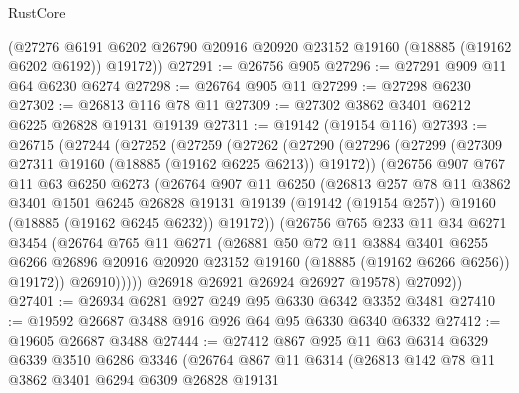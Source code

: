 \begin{lexlean}{RustCore}
\begin{coremodule}
      (@27276 @6191 @6202 @26790 @20916 @20920 @23152 @19160 (@18885 (@19162 @6202 @6192)) @19172))
@27291 := @26756 @905
@27296 := @27291 @909 @11 @64 @6230 @6274
@27298 := @26764 @905 @11
@27299 := @27298 @6230
@27302 := @26813 @116 @78 @11
@27309 := @27302 @3862 @3401 @6212 @6225 @26828 @19131 @19139
@27311 := @19142 (@19154 @116)
@27393 := @26715
    (@27244
      (@27252
        (@27259
          (@27262
            (@27290
              (@27296
                (@27299 (@27309 @27311 @19160 (@18885 (@19162 @6225 @6213)) @19172))
                (@26756
                  @907
                  @767
                  @11
                  @63
                  @6250
                  @6273
                  (@26764
                    @907
                    @11
                    @6250
                    (@26813
                      @257
                      @78
                      @11
                      @3862
                      @3401
                      @1501
                      @6245
                      @26828
                      @19131
                      @19139
                      (@19142 (@19154 @257))
                      @19160
                      (@18885 (@19162 @6245 @6232))
                      @19172))
                  (@26756
                    @765
                    @233
                    @11
                    @34
                    @6271
                    @3454
                    (@26764
                      @765
                      @11
                      @6271
                      (@26881
                        @50
                        @72
                        @11
                        @3884
                        @3401
                        @6255
                        @6266
                        @26896
                        @20916
                        @20920
                        @23152
                        @19160
                        (@18885 (@19162 @6266 @6256))
                        @19172))
                    @26910)))))
          @26918
          @26921
          @26924
          @26927
          @19578)
        @27092))
@27401 := @26934 @6281 @927 @249 @95 @6330 @6342 @3352 @3481
@27410 := @19592 @26687 @3488 @916 @926 @64 @95 @6330 @6340 @6332
@27412 := @19605 @26687 @3488
@27444 := @27412
    @867
    @925
    @11
    @63
    @6314
    @6329
    @6339
    @3510
    @6286
    @3346
    (@26764
      @867
      @11
      @6314
      (@26813
        @142
        @78
        @11
        @3862
        @3401
        @6294
        @6309
        @26828
        @19131

\end{coremodule}
\end{lexlean}
